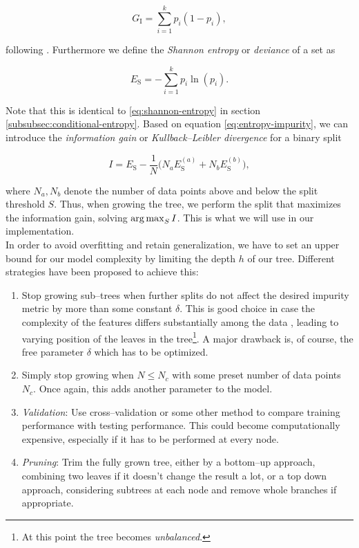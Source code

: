\begin{equation}
\label{eq:gini-impurity}
G_{\text{I}} = \sum\limits_{i=1}^k p_i (1 - p_i),
\end{equation}

following \citet{astroML,hastie2001,ripley2007}. Furthermore we define the \emph{Shannon entropy} or \emph{deviance} of a set as

\begin{equation}
\label{eq:entropy-impurity}
E_{\text{S}} = - \sum\limits_{i=1}^k p_i \ln(p_i).
\end{equation}

Note that this is identical to \eqref{eq:shannon-entropy} in section \ref{subsubsec:conditional-entropy}. Based on equation \eqref{eq:entropy-impurity}, we can introduce the \emph{information gain} or \emph{Kullback--Leibler divergence} \citep{kullback1951} for a binary split

\begin{equation}
\label{eq:information-gain}
I = E_{\text{S}} - \frac{1}{N} \big(N_a E_{\text{S}}^{(a)} + N_b E_{\text{S}}^{(b)}\big),
\end{equation}

where $N_a, N_b$ denote the number of data points above and below the split threshold $S$. Thus, when growing the tree, we perform the split that maximizes the information gain, \ie solving $\operatorname*{arg\,max}_S I$. This is what we will use in our implementation.\\

In order to avoid overfitting and retain generalization, we have to set an upper bound for our model complexity by limiting the depth $h$ of our tree. Different strategies have been proposed to achieve this:

\begin{enumerate}
\item \label{itm:constant-metric} Stop growing sub--trees when further splits do not affect the desired impurity metric by more than some constant $\delta$. This is good choice in case the complexity of the features differs substantially among the data \citep{duda2001}, leading to varying position of the leaves in the tree\footnote{At this point the tree becomes \emph{unbalanced}.}. A major drawback is, of course, the free parameter $\delta$ which has to be optimized.
\item \label{itm:constant-data-points} Simply stop growing when $N \le N_c$ with some preset number of data points $N_c$. Once again, this adds another parameter to the model.
\item \label{itm:validation} \emph{Validation}: Use cross--validation or some other method to compare training performance with testing performance. This could become computationally expensive, especially if it has to be performed at every node.
\item \label{itm:pruning} \emph{Pruning}: Trim the fully grown tree, either by a bottom--up approach, \ie combining two leaves if it doesn't change the result a lot, or a top down approach, considering subtrees at each node and remove whole branches if appropriate.
\end{enumerate}


